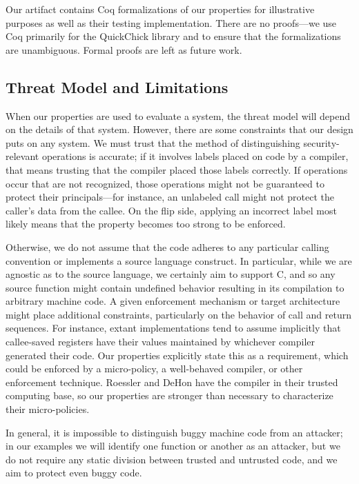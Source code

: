 \documentclass[10pt,conference]{ieeetran}%
\theoremstyle{definition}
\begin{document}
Our artifact contains Coq formalizations of our properties for illustrative purposes
as well as their testing implementation. There are no proofs---we use Coq primarily
for the QuickChick library and to ensure that the formalizations are unambiguous.
Formal proofs are left as future work.

\subsection{Threat Model and Limitations}

When our properties are used to evaluate a system, the threat model will depend on the
details of that system. However, there are some constraints that our design puts on
any system. We must trust that the method of distinguishing security-relevant operations is accurate; if it
involves labels placed on code by a compiler, that means trusting that the compiler placed
those labels correctly. If operations occur that are not recognized, those operations
might not be guaranteed to protect their principals---for instance, an unlabeled call
might not protect the caller's data from the callee. On the flip side, applying an incorrect
label most likely means that the property becomes too strong to be enforced.

Otherwise, we do not assume that the code adheres to any particular
calling convention or implements a source language construct.
In particular, while we are agnostic as to the source
language, we certainly aim to support C, and so any source function might contain undefined
behavior resulting in its compilation to arbitrary machine code. A given enforcement
mechanism or target architecture might place additional constraints, particularly on the behavior of
call and return sequences. For instance, extant implementations tend to assume
implicitly that callee-saved registers have their values maintained by whichever compiler
generated their code. Our properties explicitly state this as a requirement,
which could be enforced by a micro-policy, a well-behaved compiler, or other enforcement technique.
Roessler and DeHon have the compiler in their trusted computing base, so our properties
are stronger than necessary to characterize their micro-policies.

In general, it is impossible to distinguish buggy machine code from an attacker; in
our examples we will identify one function or another as an attacker, but we do not
require any static division between trusted and untrusted code, and we aim to protect
even buggy code.
\end{document}
